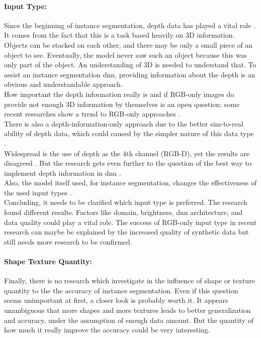 		\paragraph{Input Type:} Since the beginning of instance segmentation, depth data has played a vital role \cite{Silbermann2012}. It comes from the fact that this is a task based heavily on 3D information. Objects can be stacked on each other, and there may be only a small piece of an object to see. Eventually, the model never saw such an object because this was only part of the object. An understanding of 3D is needed to understand that. To assist an instance segmentation \ac{dnn}, providing information about the depth is an obvious and understandable approach.\\
		How important the depth information really is and if RGB-only images do provide not enough 3D information by themselves is an open question; some recent researches show a trend to RGB-only approaches \cite{Raj2023}\cite{Zakeri2024}.\\
		There is also a depth-information-only approach due to the better sim-to-real ability of depth data, which could caused by the simpler nature of this data type \cite{Danielczuk2019}.\\
		Widespread is the use of depth as the 4th channel (RGB-D), yet the results are disagreed \cite{Lüling2021}\cite{Zakeri2024}.
		But the research gets even further to the question of the best way to implement depth information in \ac{dnn} \cite{Xiang2021}\cite{Xie2020}\cite{Pei2024}\cite{Yasir2022}\cite{Shao2018}\cite{Ye2017}.\\
		Also, the model itself used, for instance segmentation, changes the effectiveness of the used input types \cite{Xiang2021}.\\
		Concluding, it needs to be clarified which input type is preferred. The research found different results. Factors like domain, brightness, \ac{dnn} architecture, and data quality could play a vital role. The success of RGB-only input type in recent research \cite{Raj2023}\cite{Zakeri2024} can maybe be explained by the increased quality of synthetic data but still needs more research to be confirmed.
		\paragraph{Shape Texture Quantity:} Finally, there is no research which investigate in the influence of shape or texture quantity to the the accuracy of instance segmentation. Even if this question seems unimportant at first, a closer look is probably worth it. It appears unambiguous that more shapes and more textures leads to better generalization and accuracy, under the assumption of enough data amount. But the quantity of how much it really improve the accuracy could be very interesting. 



